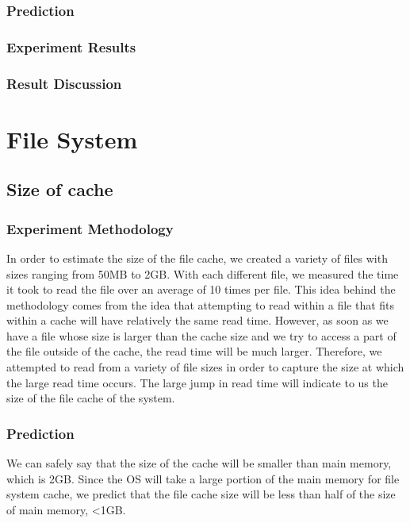 \documentclass{article} %
\begin{document}
\subsubsection{Prediction}
\subsubsection{Experiment Results}
\subsubsection{Result Discussion}


\section{File System}

\subsection{Size of cache}
\subsubsection{Experiment Methodology}
In order to estimate the size of the file cache, we created a variety of files with sizes ranging from 50MB to 2GB. With each different file, we measured the time it took to read the file over an average of 10 times per file. This idea behind the methodology comes from the idea that attempting to read within a file that fits within a cache will have relatively the same read time. However, as soon as we have a file whose size is larger than the cache size and we try to access a part of the file outside of the cache, the read time will be much larger. Therefore, we attempted to read from a variety of file sizes in order to capture the size at which the large read time occurs. The large jump in read time will indicate to us the size of the file cache of the system. 

\subsubsection{Prediction}
We can safely say that the size of the cache will be smaller than main memory, which is 2GB. Since the OS will take a large portion of the main memory for file system cache, we predict that the file cache size will be less than half of the size of main memory, <1GB. 
\end{document}
